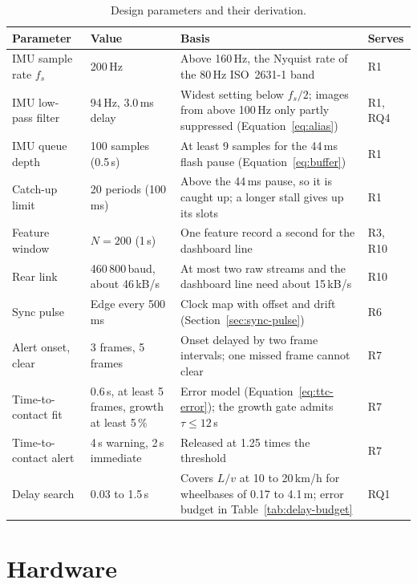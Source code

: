 \begin{table}[htbp]
\centering
\small
\caption[Design parameters and their derivation]{Design parameters and their derivation.}
\label{tab:design-params}
\begin{tabular}{|p{2.9cm}|p{2.9cm}|p{6.9cm}|p{1.2cm}|}
\hline
\textbf{Parameter} & \textbf{Value} & \textbf{Basis} & \textbf{Serves} \\ \hline
IMU sample rate $f_s$ & 200\,Hz & Above 160\,Hz, the Nyquist rate of the 80\,Hz ISO~2631-1 band \cite{iso2631} & R1 \\ \hline
IMU low-pass filter & 94\,Hz, 3.0\,ms delay & Widest setting below $f_s/2$; images from above 100\,Hz only partly suppressed (Equation~\ref{eq:alias}) & R1, RQ4 \\ \hline
IMU queue depth & 100 samples (0.5\,s) & At least 9 samples for the 44\,ms flash pause (Equation~\ref{eq:buffer}) & R1 \\ \hline
Catch-up limit & 20 periods (100\,ms) & Above the 44\,ms pause, so it is caught up; a longer stall gives up its slots & R1 \\ \hline
Feature window & $N = 200$ (1\,s) & One feature record a second for the dashboard line & R3, R10 \\ \hline
Rear link & 460\,800\,baud, about 46\,kB/s & At most two raw streams and the dashboard line need about 15\,kB/s & R10 \\ \hline
Sync pulse & Edge every 500\,ms & Clock map with offset and drift (Section~\ref{sec:sync-pulse}) & R6 \\ \hline
Alert onset, clear & 3 frames, 5 frames & Onset delayed by two frame intervals; one missed frame cannot clear & R7 \\ \hline
Time-to-contact fit & 0.6\,s, at least 5 frames, growth at least 5\,\% & Error model (Equation~\ref{eq:ttc-error}); the growth gate admits $\tau \le 12$\,s & R7 \\ \hline
Time-to-contact alert & 4\,s warning, 2\,s immediate & Released at 1.25 times the threshold & R7 \\ \hline
Delay search & 0.03 to 1.5\,s & Covers $L/v$ at 10 to 20\,km/h for wheelbases of 0.17 to 4.1\,m; error budget in Table~\ref{tab:delay-budget} & RQ1 \\ \hline
\end{tabular}
\end{table}

\section{Hardware}
\label{sec:hardware}
\label{sec:camera-mount}

